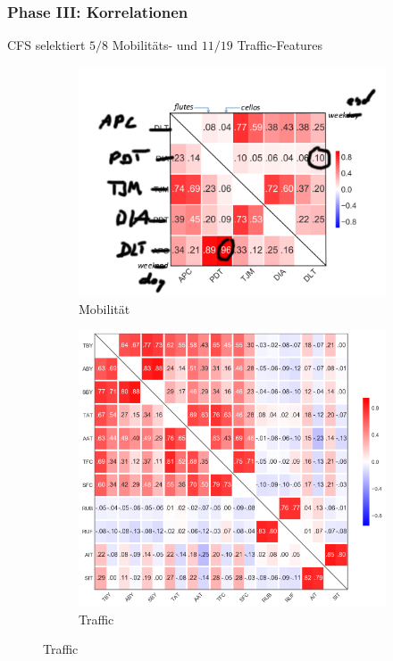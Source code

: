 \documentclass{beamer}
\begin{document}
\begin{frame}
  \frametitle{Phase III: Korrelationen}
  CFS selektiert $5 / 8$ Mobilitäts- und $11 / 19$ Traffic-Features

  \begin{figure}[H]
    \centering
    \begin{subfigure}[b]{0.4\textwidth}
      \includegraphics[width=1.2\textwidth]{images/mobility_correlations.png}
      \caption*{Mobilität}
    \end{subfigure}
    \hspace{10px}
    \begin{subfigure}[b]{0.4\textwidth}
      \includegraphics[width=1.2\textwidth]{images/traffic_correlations.png}  
      \caption*{Traffic}
    \end{subfigure}    
  \end{figure}  
\end{frame}
\end{document}
